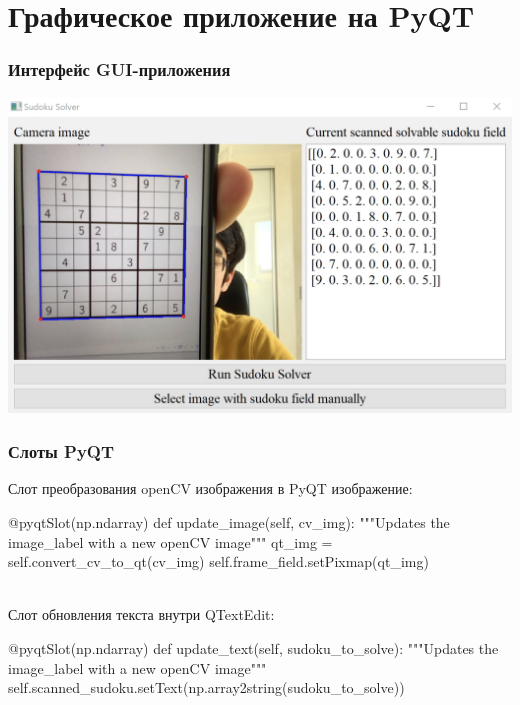 \documentclass{beamer}
\begin{document}
\section{Графическое приложение на PyQT}

\begin{frame}
\frametitle{Интерфейс GUI-приложения}
\includegraphics[width=\textwidth]{sudoku_app_in_action}
\end{frame}

\begin{frame}[fragile]
\frametitle{Слоты PyQT}

Слот преобразования openCV изображения в PyQT изображение:
\begin{pythoncode}
    @pyqtSlot(np.ndarray)
    def update_image(self, cv_img):
        """Updates the image_label with a new openCV image"""
        qt_img = self.convert_cv_to_qt(cv_img)
        self.frame_field.setPixmap(qt_img)
\end{pythoncode}
\ \\
Слот обновления текста внутри QTextEdit:
\begin{pythoncode}
    @pyqtSlot(np.ndarray)
    def update_text(self, sudoku_to_solve):
        """Updates the image_label with a new openCV image"""
        self.scanned_sudoku.setText(np.array2string(sudoku_to_solve))
\end{pythoncode}

\end{frame}
\end{document}
